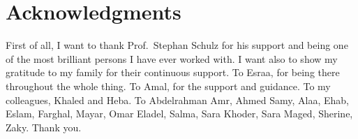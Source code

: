 \chapter*{Acknowledgments}
\label{chap:ack}

First of all, I want to thank Prof.\ Stephan Schulz for his support and being one of the most brilliant persons I have ever worked with. I want also to show my gratitude to my family for their continuous support. To Esraa, for being there throughout the whole thing. To Amal, for the support and guidance. To my colleagues, Khaled and Heba. To Abdelrahman Amr, Ahmed Samy, Alaa, Ehab, Eslam, Farghal, Mayar, Omar Eladel, Salma, Sara Khoder, Sara Maged, Sherine, Zaky. Thank you.
